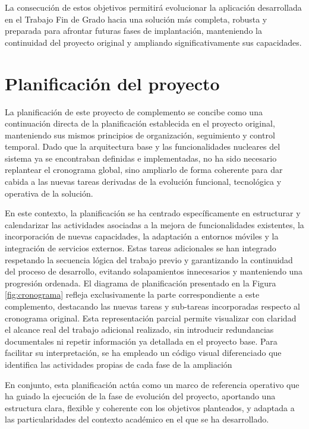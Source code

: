 La consecución de estos objetivos permitirá evolucionar la aplicación desarrollada en el Trabajo Fin de Grado hacia una solución más completa, robusta y preparada para afrontar futuras fases de implantación, manteniendo la continuidad del proyecto original y ampliando significativamente sus capacidades.
\section{Planificación del proyecto}
\label{chap:planificacion}

La planificación de este proyecto de complemento se concibe como una continuación directa de la planificación establecida en el proyecto original, manteniendo sus mismos principios de organización, seguimiento y control temporal. Dado que la arquitectura base y las funcionalidades nucleares del sistema ya se encontraban definidas e implementadas, no ha sido necesario replantear el cronograma global, sino ampliarlo de forma coherente para dar cabida a las nuevas tareas derivadas de la evolución funcional, tecnológica y operativa de la solución.

En este contexto, la planificación se ha centrado específicamente en estructurar y calendarizar las actividades asociadas a la mejora de funcionalidades existentes, la incorporación de nuevas capacidades, la adaptación a entornos móviles y la integración de servicios externos. Estas tareas adicionales se han integrado respetando la secuencia lógica del trabajo previo y garantizando la continuidad del proceso de desarrollo, evitando solapamientos innecesarios y manteniendo una progresión ordenada.
\newpage
El diagrama de planificación presentado en la Figura \ref{fig:cronograma} refleja exclusivamente la parte correspondiente a este complemento, destacando las nuevas tareas y sub-tareas incorporadas respecto al cronograma original. Esta representación parcial permite visualizar con claridad el alcance real del trabajo adicional realizado, sin introducir redundancias documentales ni repetir información ya detallada en el proyecto base. Para facilitar su interpretación, se ha empleado un código visual diferenciado que identifica las actividades propias de cada fase de la ampliación

En conjunto, esta planificación actúa como un marco de referencia operativo que ha guiado la ejecución de la fase de evolución del proyecto, aportando una estructura clara, flexible y coherente con los objetivos planteados, y adaptada a las particularidades del contexto académico en el que se ha desarrollado.

